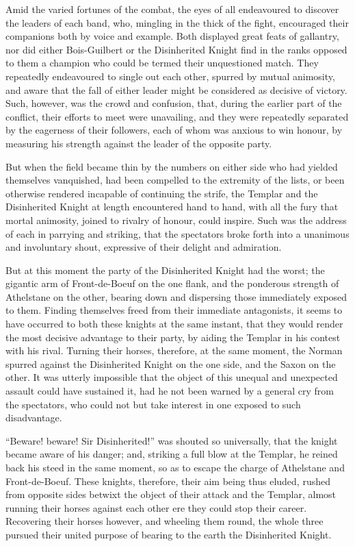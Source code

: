 Amid the varied fortunes of the combat, the eyes of all endeavoured to
discover the leaders of each band, who, mingling in the thick of the
fight, encouraged their companions both by voice and example. Both
displayed great feats of gallantry, nor did either Bois-Guilbert or the
Disinherited Knight find in the ranks opposed to them a champion who
could be termed their unquestioned match. They repeatedly endeavoured to
single out each other, spurred by mutual animosity, and aware that the
fall of either leader might be considered as decisive of victory. Such,
however, was the crowd and confusion, that, during the earlier part of
the conflict, their efforts to meet were unavailing, and they were
repeatedly separated by the eagerness of their followers, each of whom
was anxious to win honour, by measuring his strength against the leader
of the opposite party.

But when the field became thin by the numbers on either side who had
yielded themselves vanquished, had been compelled to the extremity of
the lists, or been otherwise rendered incapable of continuing the
strife, the Templar and the Disinherited Knight at length encountered
hand to hand, with all the fury that mortal animosity, joined to rivalry
of honour, could inspire. Such was the address of each in parrying and
striking, that the spectators broke forth into a unanimous and
involuntary shout, expressive of their delight and admiration.

But at this moment the party of the Disinherited Knight had the worst;
the gigantic arm of Front-de-Boeuf on the one flank, and the ponderous
strength of Athelstane on the other, bearing down and dispersing those
immediately exposed to them. Finding themselves freed from their
immediate antagonists, it seems to have occurred to both these knights
at the same instant, that they would render the most decisive advantage
to their party, by aiding the Templar in his contest with his rival.
Turning their horses, therefore, at the same moment, the Norman spurred
against the Disinherited Knight on the one side, and the Saxon on the
other. It was utterly impossible that the object of this unequal and
unexpected assault could have sustained it, had he not been warned by a
general cry from the spectators, who could not but take interest in one
exposed to such disadvantage.

``Beware! beware! Sir Disinherited!'' was shouted so universally, that
the knight became aware of his danger; and, striking a full blow at the
Templar, he reined back his steed in the same moment, so as to escape
the charge of Athelstane and Front-de-Boeuf. These knights, therefore,
their aim being thus eluded, rushed from opposite sides betwixt the
object of their attack and the Templar, almost running their horses
against each other ere they could stop their career. Recovering their
horses however, and wheeling them round, the whole three pursued their
united purpose of bearing to the earth the Disinherited Knight.

